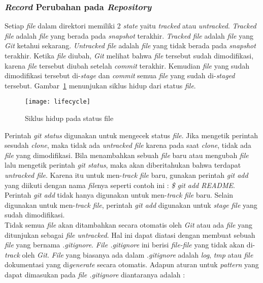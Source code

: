 \subsubsection{\textit{Record} Perubahan pada \textit{Repository}}
Setiap \textit{file} dalam direktori memiliki 2 \textit{state} yaitu \textit{tracked} atau \textit{untracked}. \textit{Tracked file} adalah \textit{file} yang berada pada \textit{snapshot} terakhir. \textit{Tracked file} adalah \textit{file} yang \textit{Git} ketahui sekarang. \textit{Untracked file} adalah \textit{file} yang tidak berada pada \textit{snapshot} terakhir. Ketika \textit{file} diubah, \textit{Git} melihat bahwa \textit{file} tersebut sudah dimodifikasi, karena \textit{file} tersebut diubah setelah \textit{commit} terakhir. Kemudian \textit{file} yang sudah dimodifikasi tersebut di-\textit{stage} dan \textit{commit} semua \textit{file} yang sudah di-\textit{staged} tersebut. Gambar~\ref{fig:lifecycle} menunjukan siklus hidup dari status \textit{file}.

\begin{figure}[H]
	\centering  
	\texttt{[image: lifecycle]}  
	\caption[Siklus hidup pada status \textit{file}]{Siklus hidup pada status file}
	\label{fig:lifecycle} 
\end{figure}

Perintah \textit{git status} digunakan untuk mengecek status \textit{file}. Jika mengetik perintah sesudah \textit{clone}, maka tidak ada \textit{untracked file} karena pada saat \textit{clone}, tidak ada \textit{file} yang dimodifikasi. Bila menambahkan sebuah \textit{file} baru atau mengubah \textit{file} lalu mengetik perintah \textit{git status}, maka akan diberitahukan bahwa terdapat \textit{untracked file}. Karena itu untuk men-\textit{track file} baru, gunakan perintah \textit{git add} yang diikuti dengan nama \textit{file}nya seperti contoh ini : \textit{\$ git add README}. Perintah \textit{git add} tidak hanya digunakan untuk men-\textit{track file} baru. Selain digunakan untuk men-\textit{track file}, perintah \textit{git add} digunakan untuk \textit{stage} \textit{file} yang sudah dimodifikasi.\\

Tidak semua \textit{file} akan ditambahkan secara otomatis oleh \textit{Git} atau ada \textit{file} yang ditunjukan sebagai \textit{file untracked}. Hal ini dapat diatasi dengan membuat sebuah \textit{file} yang bernama \textit{.gitignore}. \textit{File .gitignore} ini berisi \textit{file-file} yang tidak akan di-\textit{track} oleh \textit{Git}. \textit{File} yang biasanya ada dalam \textit{.gitignore} adalah \textit{log}, \textit{tmp} atau \textit{file} dokumentasi yang di\textit{generate} secara otomatis. Adapun aturan untuk \textit{pattern} yang dapat dimasukan pada \textit{file .gitignore} diantaranya adalah :

